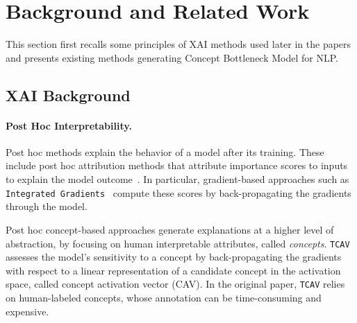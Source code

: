 \section{Background and Related Work}
\label{bk_rw}
This section first recalls some principles of XAI methods used later in the papers and presents existing methods generating Concept Bottleneck Model for NLP.


\subsection{XAI Background}
\paragraph{Post Hoc Interpretability.}
Post hoc methods explain the behavior of a model after its training. These include post hoc attribution methods that attribute importance scores to inputs to explain the model outcome~\cite{zhao_explainability_2023}. In particular, gradient-based approaches such as \texttt{Integrated Gradients}~\cite{sundararajan_axiomatic_2017} compute these scores by back-propagating the gradients through the model.

Post hoc concept-based approaches generate explanations at a higher level of abstraction, by focusing on human interpretable attributes, called \emph{concepts}. %
\texttt{TCAV}~\cite{tcav}
assesses the model's sensitivity to a concept by back-propagating the gradients with respect to a linear representation of a candidate concept in the activation space, called concept activation vector (CAV). In the original paper, 
\texttt{TCAV} relies on human-labeled concepts, whose annotation can be time-consuming and expensive.  



